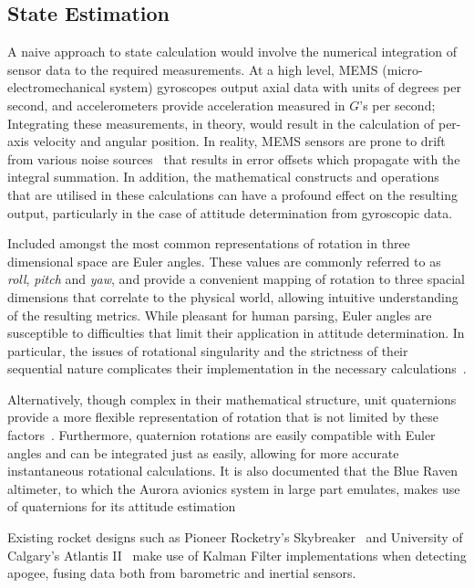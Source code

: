 \subsection{State Estimation}
A naive approach to state calculation would involve the numerical integration of sensor data to the required measurements. At a high level, MEMS (micro-electromechanical system) gyroscopes output axial data with units of degrees per second, and accelerometers provide acceleration measured in $\unit{G}$'s per second; Integrating these measurements, in theory, would result in the calculation of per-axis velocity and angular position. In reality, MEMS sensors are prone to drift from various noise sources~\cite{Diao2013, Pang2001} that results in error offsets which propagate with the integral summation. In addition, the mathematical constructs and operations that are utilised in these calculations can have a profound effect on the resulting output, particularly in the case of attitude determination from gyroscopic data.

Included amongst the most common representations of rotation in three dimensional space are Euler angles. These values are commonly referred to as \textit{roll}, \textit{pitch} and \textit{yaw}, and provide a convenient mapping of rotation to three spacial dimensions that correlate to the physical world, allowing intuitive understanding of the resulting metrics. While pleasant for human parsing, Euler angles are susceptible to difficulties that limit their application in attitude determination. In particular, the issues of rotational singularity and the strictness of their sequential nature complicates their implementation in the necessary calculations~\cite{Hemingway2018, Diebel2006}.

Alternatively, though complex in their mathematical structure, unit quaternions provide a more flexible representation of rotation that is not limited by these factors~\cite{Diebel2006}. Furthermore, quaternion rotations are easily compatible with Euler angles and can be integrated just as easily, allowing for more accurate instantaneous rotational calculations. It is also documented that the Blue Raven altimeter, to which the Aurora avionics system in large part emulates, makes use of quaternions for its attitude estimation~\cite{Adamson2023, Adamson2023timeseries}

Existing rocket designs such as Pioneer Rocketry's Skybreaker~\cite{Pioneer2016} and University of Calgary's Atlantis II~\cite{Atlantis2018} make use of Kalman Filter implementations when detecting apogee, fusing data both from barometric and inertial sensors.

